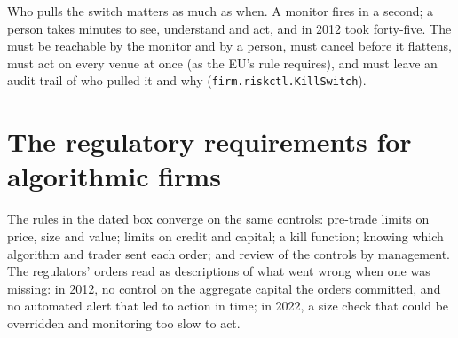 \begin{omfigure}

\label{fig:hf:risk-controls:tradeoff}
\end{omfigure}

Who pulls the switch matters as much as when. A monitor fires in a second; a person takes minutes to see, understand and act, and in 2012 took
forty-five. The  must be reachable by the monitor and by a person, must cancel before it flattens, must act on every venue at once (as
the EU's rule requires), and must leave an audit trail of who pulled it and why (\texttt{firm.riskctl.KillSwitch}).

\section{The regulatory requirements for algorithmic firms}

The rules in the dated box converge on the same controls: pre-trade limits on price, size and value; limits on credit and capital; a kill
function; knowing which algorithm and trader sent each order; and review of the controls by management. The regulators' orders read as descriptions
of what went wrong when one was missing: in 2012, no control on the aggregate capital the orders committed, and no automated alert that led to action
in time; in 2022, a size check that could be overridden and monitoring too slow to act.

